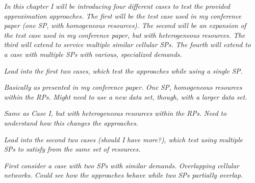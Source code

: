\documentclass[12pt,dvipsnames]{report}
\begin{document}
\textit{In this chapter I will be introducing four different cases to test the provided approximation approaches.  The first will be the test case used in my conference paper (one SP, with homogeneous resources).  The second will be an expansion of the test case used in my conference paper, but with heterogeneous resources.  The third will extend to service multiple similar cellular SPs.  The fourth will extend to a case with multiple SPs with various, specialized demands.}


\textit{Lead into the first two cases, which test the approaches while using a single SP.}


\textit{Basically as presented in my conference paper.  One SP, homogeneous resources within the RPs.  Might need to use a new data set, though, with a larger data set.}


\textit{Same as Case I, but with heterogeneous resources within the RPs.  Need to understand how this changes the approaches.}


\textit{Lead into the second two cases (should I have more?), which test using multiple SPs to satisfy from the same set of resources.}


\textit{First consider a case with two SPs with similar demands.  Overlapping cellular networks.  Could see how the approaches behave while two SPs partially overlap.}
\end{document}
